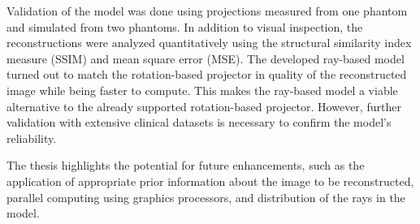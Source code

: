 \begin{titlepage}
    \newpage\thispagestyle{empty}

    Validation of the model was done using projections measured from one phantom and simulated from two phantoms. In addition to visual inspection, the reconstructions were analyzed quantitatively using the structural similarity index measure (SSIM) and mean square error (MSE). The developed ray-based model turned out to match the rotation-based projector in quality of the reconstructed image while being faster to compute. This makes the ray-based model a viable alternative to the already supported rotation-based projector. However, further validation with extensive clinical datasets is necessary to confirm the model's reliability.
    
    The thesis highlights the potential for future enhancements, such as the application of appropriate prior information about the image to be reconstructed, parallel computing using graphics processors, and distribution of the rays in the model.
\end{titlepage}